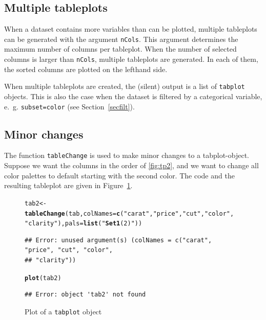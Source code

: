 \documentclass[11pt, fleqn, a4paper]{article}\usepackage{graphicx, color}
\makeatletter
\newcommand{\hlfunctioncall}[1]{\textcolor[rgb]{0.501960784313725,0,0.329411764705882}{\textbf{#1}}}%
\newcommand{\hlstring}[1]{\textcolor[rgb]{0.6,0.6,1}{#1}}%
\newenvironment{kframe}{%
 \def\FrameCommand##1{\hskip\@totalleftmargin \hskip-\fboxsep
 \colorbox{shadecolor}{##1}\hskip-\fboxsep
     \hskip-\linewidth \hskip-\@totalleftmargin \hskip\columnwidth}%
 \MakeFramed {\advance\hsize-\width
   \@totalleftmargin\z@ \linewidth\hsize
   \@setminipage}}%
 {\par\unskip\endMakeFramed}
\newenvironment{knitrout}{}{} %
\makeatother
\begin{document}
\subsection{Multiple tableplots}

When a dataset contains more variables than can be plotted, multiple tableplots can be generated with the argument {\tt nCols}. This argument determines the maximum number of columns per tableplot. When the number of selected columns is larger than {\tt nCols}, multiple tableplots are generated. In each of them, the sorted columns are plotted on the lefthand side. 

When multiple tableplots are created, the (silent) output is a list of {\tt tabplot} objects. This is also the case when the dataset is filtered by a categorical variable, e.~g. {\tt subset=color}
(see Section~\ref{secfilt}).

\subsection{Minor changes}

The function {\tt tableChange} is used to make minor changes to a tabplot-object. Suppose we want the columns in the order of \ref{fig:tp2}, and we want to change all color palettes to default starting with the second color. The code and the resulting tableplot are given in Figure~\ref{fig:tp5}.

\begin{figure}[htp]
\begin{knitrout}
\color{fgcolor}\begin{kframe}
\begin{alltt}
tab2 <- \hlfunctioncall{tableChange}(tab, colNames = \hlfunctioncall{c}(\hlstring{"carat"}, \hlstring{"price"}, \hlstring{"cut"}, \hlstring{"color"}, 
    \hlstring{"clarity"}), pals = \hlfunctioncall{list}(\hlstring{"\hlfunctioncall{Set1}(2)"}))
\end{alltt}
\begin{verbatim}
## Error: unused argument(s) (colNames = c("carat", "price", "cut", "color",
## "clarity"))
\end{verbatim}
\begin{alltt}
\hlfunctioncall{plot}(tab2)
\end{alltt}
\begin{verbatim}
## Error: object 'tab2' not found
\end{verbatim}
\end{kframe}
\end{knitrout}

\caption{Plot of a {\tt tabplot} object}
\label{fig:tp5}
\end{figure}
\end{document}
